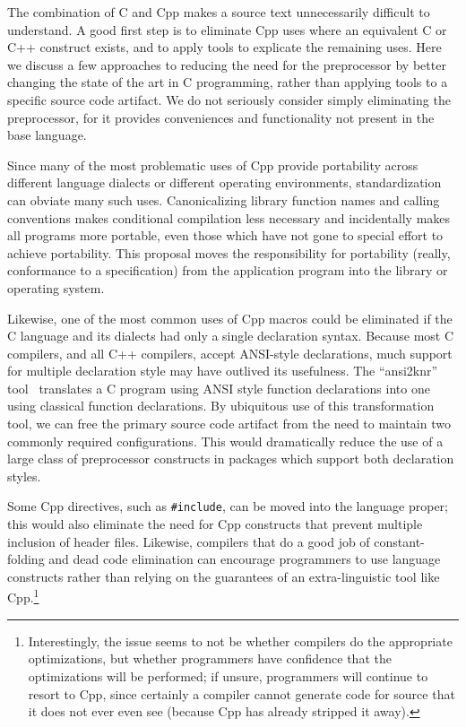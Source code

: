 \documentclass[10pt]{article}
\begin{document}
The combination of C and Cpp makes a source text unnecessarily difficult
to understand.  A good first step is to eliminate Cpp uses where an
equivalent C or C++ construct exists, and to apply tools to explicate
the remaining uses.  Here we discuss a few approaches to reducing the
need for the preprocessor by better changing the state of the art in C
programming, rather than applying tools to a specific source code
artifact.  We do not seriously consider simply eliminating the
preprocessor, for it provides conveniences and functionality not present
in the base language.

Since many of the most problematic uses of Cpp provide portability across
different language dialects or different operating environments,
standardization can obviate many such uses.  Canonicalizing library
function names and calling conventions makes conditional compilation less
necessary and incidentally makes all programs more portable, even those
which have not gone to special effort to achieve portability.  This
proposal moves the responsibility for portability (really, conformance to a
specification) from the application program into the library or operating
system.  

Likewise, one of the most common uses of Cpp macros could be eliminated
if the C language and its dialects had only a single declaration syntax.
Because most C compilers, and all C++ compilers, accept ANSI-style
declarations, much support for multiple declaration style may have
outlived its usefulness.  The ``ansi2knr'' tool~\cite{Deutsch90}
translates a C program using ANSI style function declarations into one
using classical function declarations.  By ubiquitous use of this
transformation tool, we can free the primary source code artifact from
the need to maintain two commonly required configurations.  This would
dramatically reduce the use of a large class of preprocessor constructs
in packages which support both declaration styles.

Some Cpp directives, such as {\tt \#include}, can be moved into the
language proper; this would also eliminate the need for Cpp constructs that
prevent multiple inclusion of header files.  Likewise, compilers that do a
good job of constant-folding and dead code elimination can encourage
programmers to use language constructs rather than relying on the
guarantees of an extra-linguistic tool like Cpp.\footnote{Interestingly,
  the issue seems to not be whether compilers do the appropriate
  optimizations, but whether programmers have confidence that the
  optimizations will be performed; if unsure, programmers will continue to
  resort to Cpp, since certainly a compiler cannot generate code for source
  that it does not ever even see (because Cpp has already stripped it
  away).}
\end{document}
